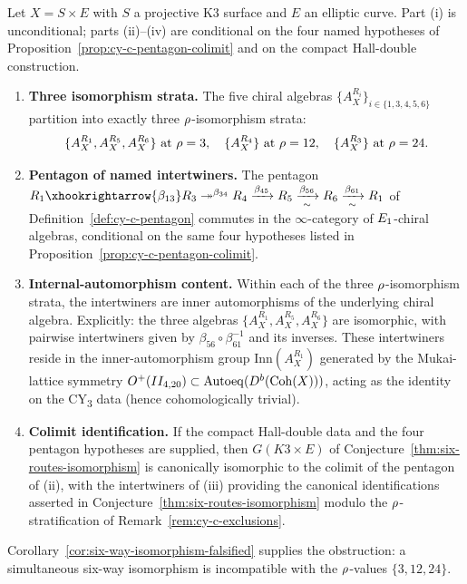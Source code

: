 \begin{theorem}
\label{thm:cy-c-six-routes-generator-level-convergence}
Let $X = S \times E$ with $S$ a projective K3 surface and $E$ an elliptic curve. Part (i) is unconditional;
parts (ii)--(iv) are conditional on the four named hypotheses of
Proposition~\ref{prop:cy-c-pentagon-colimit} and on the compact Hall-double construction.
\begin{enumerate}[label=\textup{(\roman*)}]
 \item \textbf{Three isomorphism strata.} The five chiral algebras $\{A_X^{R_i}\}_{i \in \{1, 3, 4, 5, 6\}}$
 partition into exactly three $\rho$-isomorphism strata:
 \[
 \{A_X^{R_1}, A_X^{R_5}, A_X^{R_6}\} \text{ at } \rho = 3, \quad
 \{A_X^{R_4}\} \text{ at } \rho = 12, \quad
 \{A_X^{R_3}\} \text{ at } \rho = 24.
 \]
 \item \textbf{Pentagon of named intertwiners.} The pentagon
 $R_1 \xhookrightarrow{\beta_{13}} R_3 \twoheadrightarrow^{\beta_{34}} R_4 \xrightarrow{\beta_{45}} R_5 \xrightarrow[\sim]{\beta_{56}} R_6 \xrightarrow[\sim]{\beta_{61}} R_1$
 of Definition~\ref{def:cy-c-pentagon} commutes in the $\infty$-category of $E_{1}$-chiral algebras,
 conditional on the same four hypotheses listed in Proposition~\ref{prop:cy-c-pentagon-colimit}.
 \item \textbf{Internal-automorphism content.} Within each of the three $\rho$-isomorphism strata, the
 intertwiners are inner automorphisms of the underlying chiral algebra. Explicitly: the three
 algebras $\{A_X^{R_1}, A_X^{R_5}, A_X^{R_6}\}$ are isomorphic, with pairwise intertwiners given by
 $\beta_{56} \circ \beta_{61}^{-1}$ and its inverses. These intertwiners reside in the inner-automorphism
 group $\mathrm{Inn}(A_X^{R_1})$ generated by the Mukai-lattice symmetry
 $O^+(II_{4, 20}) \subset \mathrm{Autoeq}(D^b(\mathrm{Coh}(X)))$, acting as the identity on the CY\textsubscript{3}
 data (hence cohomologically trivial).
 \item \textbf{Colimit identification.} If the compact Hall-double data and the four pentagon hypotheses are
 supplied, then $G(K3 \times E)$ of Conjecture~\ref{thm:six-routes-isomorphism}
 is canonically isomorphic to the colimit of the pentagon of (ii), with the intertwiners of (iii)
 providing the canonical identifications asserted in Conjecture~\ref{thm:six-routes-isomorphism}
 modulo the $\rho$-stratification of Remark~\ref{rem:cy-c-exclusions}.
\end{enumerate}
Corollary~\ref{cor:six-way-isomorphism-falsified} supplies the obstruction: a simultaneous six-way
isomorphism is incompatible with the $\rho$-values $\{3, 12, 24\}$.
\end{theorem}

